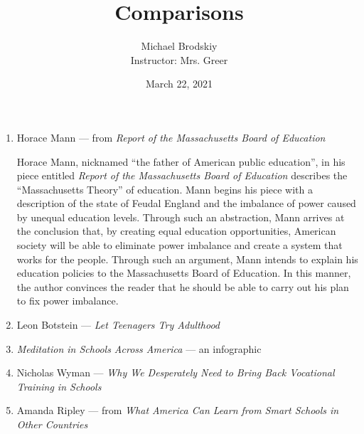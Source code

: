 \documentclass[12pt]{article}
\title{Comparisons}
\date{March 22, 2021}
\author{Michael Brodskiy\\ \small Instructor: Mrs. Greer}
\begin{document}
    \maketitle

    \begin{enumerate}

      \item Horace Mann — from \textit{Report of the Massachusetts Board of Education}

        \begin{justify}
          Horace Mann, nicknamed “the father of American public education”, in his piece entitled \textit{Report of the Massachusetts Board of Education} describes the “Massachusetts Theory” of education. Mann begins his piece with a description of the state of Feudal England and the imbalance of power caused by unequal education levels. Through such an abstraction, Mann arrives at the conclusion that, by creating equal education opportunities, American society will be able to eliminate power imbalance and create a system that works for the people. Through such an argument, Mann intends to explain his education policies to the Massachusetts Board of Education. In this manner, the author convinces the reader that he should be able to carry out his plan to fix power imbalance.
        \end{justify}

      \item Leon Botstein — \textit{Let Teenagers Try Adulthood}

        \begin{justify}
        \end{justify}

      \item \textit{Meditation in Schools Across America} — an infographic

        \begin{justify}
        \end{justify}

      \item Nicholas Wyman — \textit{Why We Desperately Need to Bring Back Vocational Training in Schools}

        \begin{justify}
        \end{justify}

      \item Amanda Ripley — from \textit{What America Can Learn from Smart Schools in Other Countries}


\end{enumerate}
\end{document}
